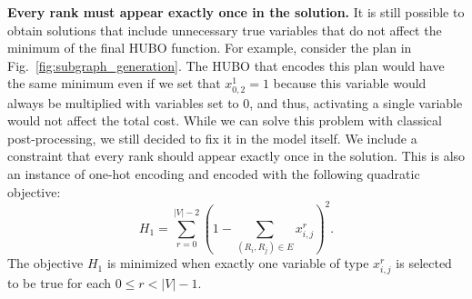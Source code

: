 \textbf{Every rank must appear exactly once in the solution.}
It is still possible to obtain solutions that include unnecessary true variables that do not affect the minimum of the final HUBO function. For example, consider the plan in Fig.~\ref{fig:subgraph_generation}. The HUBO that encodes this plan would have the same minimum even if we set that $x_{0,2}^{1} = 1$ because this variable would always be multiplied with variables set to $0$, and thus, activating a single variable would not affect the total cost. While we can solve this problem with classical post-processing, we still decided to fix it in the model itself. We include a constraint that every rank should appear exactly once in the solution. This is also an instance of one-hot encoding \cite{dimod_generators_combinations} and encoded with the following quadratic objective:
\begin{equation}\label{eq:every_rank_has_one_join}
    H_1 = \sum_{r = 0}^{|V| - 2}\left( 1 - \sum_{(R_i, R_j) \in E} x_{i,j}^{r} \right)^2.
\end{equation}
The objective $H_1$ is minimized when exactly one variable of type $x_{i,j}^{r}$ is selected to be true for each $0 \leq r <|V|- 1$.